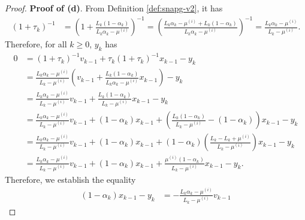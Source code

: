 \documentclass[12pt]{article}
\begin{document}
\begin{proof}
            \par
            \textbf{Proof of (d)}.
            From Definition \ref{def:snapg-v2}, it has
            \begin{align*}
                (1 + \tau_k)^{-1}
                &=
                \left(
                    1 + \frac{L_k(1 - \alpha_k)}{L_k\alpha_k - \mu^{(i)}}
                \right)^{-1} = \left(
                    \frac{L_k\alpha_k - \mu^{(i)} + L_k(1 - \alpha_k)}{L_k\alpha_k - \mu^{(i)}}
                \right)^{-1}
                = \frac{L_k\alpha_k - \mu^{(i)}}{L_k - \mu^{(i)}}. 
            \end{align*}
            Therefore, for all $k \ge 0$, $y_k$ has 
            \begin{align*}
                0 &= (1 + \tau_k)^{-1} v_{k - 1} + \tau_k (1 + \tau_k)^{-1} x_{k - 1} - y_k
                \\
                &= \frac{L_k\alpha_k - \mu^{(i)}}{L_k - \mu^{(i)}} 
                \left(
                    v_{k - 1} + \frac{L_k(1 - \alpha_k)}{L_k\alpha_k - \mu^{(i)}} x_{k - 1}
                \right) - y_k
                \\
                &= \frac{L_k\alpha_k - \mu^{(i)}}{L_k - \mu^{(i)}} v_{k - 1}
                + \frac{L_k(1 - \alpha_k)}{L_k - \mu^{(i)}} x_{k - 1} - y_k
                \\
                &= \frac{L_k\alpha_k - \mu^{(i)}}{L_k - \mu^{(i)}} v_{k - 1} + (1 - \alpha_k)x_{k - 1}
                + 
                \left(
                    \frac{L_k(1 - \alpha_k)}{L_k - \mu^{(i)}} - (1 - \alpha_k)
                \right) x_{k - 1} - y_k
                \\
                &= \frac{L_k\alpha_k - \mu^{(i)}}{L_k - \mu^{(i)}} v_{k - 1} + (1 - \alpha_k)x_{k - 1}
                + 
                (1 - \alpha_k)\left(
                    \frac{L_k - L_k + \mu^{(i)}}{L_k - \mu^{(i)}}
                \right) x_{k - 1} - y_k
                \\
                &= \frac{L_k\alpha_k - \mu^{(i)}}{L_k - \mu^{(i)}} v_{k - 1} + (1 - \alpha_k)x_{k - 1}
                + 
                \frac{\mu^{(i)}(1 - \alpha_k)}{L_k - \mu^{(i)}}x_{k - 1} - y_k. 
            \end{align*}
            Therefore, we establish the equality 
            \begin{align*}
                (1 - \alpha_k)x_{k - 1} - y_k &= 
                - \frac{L_k\alpha_k - \mu^{(i)}}{L_k - \mu^{(i)}} v_{k - 1} 

\end{align*}
\end{proof}
\end{document}
